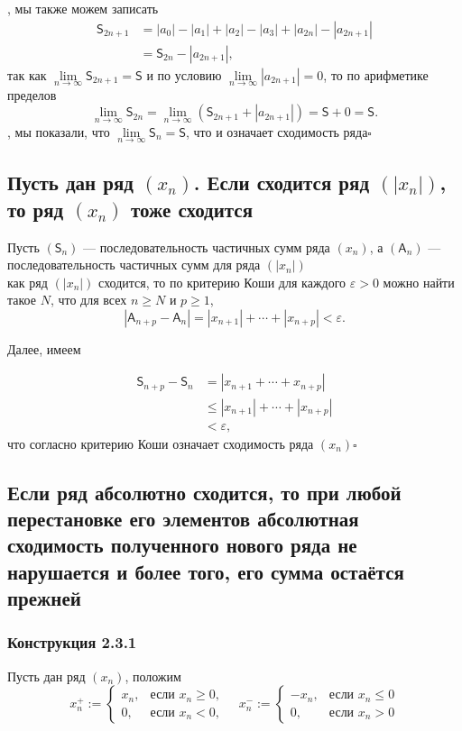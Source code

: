 \documentclass[a4paper]{article}
\newcommand{\qed}{\hfill$\square$}
\begin{document}
, мы также можем записать
$$\begin{aligned}
\mathsf{S}_{2n+1} &= |a_0| - |a_1| + |a_2| - |a_3| +  |a_{2n}| - |a_{2n+1}| \\
&= \mathsf{S}_{2n}  - |a_{2n+1}|,
\end{aligned}$$
так как $\lim\limits_{n \to \infty}\mathsf{S}_{2n+1} = \mathsf{S}$ и по условию $\lim\limits_{n\to \infty} |a_{2n+1}| = 0$, то по арифметике пределов
$$
\lim_{n\to \infty}\mathsf{S}_{2n}  = \lim_{n\to \infty} \left( \mathsf{S}_{2n+1} + |a_{2n+1}| \right) = \mathsf{S} + 0 = \mathsf{S}.
$$
, мы показали, что $\lim\limits_{n \to \infty}\mathsf{S}_n = \mathsf{S}$, что и означает сходимость ряда\qed

\subsection{Пусть дан ряд $(x_n)$. Если сходится ряд $(|x_n|)$, то ряд $(x_n)$ тоже сходится}
\label{2.2}
Пусть $(\mathsf{S}_n)$ — последовательность частичных сумм ряда $(x_n)$, а $(\mathsf{A}_n)$ — последовательность частичных сумм для ряда $(|x_n|)$\\[2mm]
 как ряд $(|x_n|)$ сходится, то по критерию Коши для каждого $\varepsilon >0$ можно найти такое $N$, что для всех $n \geqslant N$ и $p \geqslant 1$,  
$$
| \mathsf{A}_{n+p} - \mathsf{A}_{n} | = |x_{n+1} | + \cdots +|x_{n+p}| < \varepsilon.
$$

Далее, имеем 

$$\begin{aligned}
\mathsf{S}_{n+p} - \mathsf{S}_n &= | x_{n+1} + \cdots + x_{n+p} | \\
&\leqslant  |x_{n+1}| + \cdots + |x_{n+p}| \\
&< \varepsilon,
\end{aligned}$$
что согласно критерию Коши  означает сходимость ряда $(x_n)$\qed 

\subsection{Если ряд абсолютно сходится, то при любой перестановке его элементов абсолютная сходимость полученного нового ряда не нарушается и более того, его сумма
остаётся прежней}
\subsubsection*{Конструкция 2.3.1}
Пусть дан ряд $(x_n)$, положим\label{2.1}
\begin{equation}\label{eq:1}
    x_n^+:=\begin{cases}
        x_n,&\text{если } x_n\geqslant0,\\
        0,&\text{если } x_n<0,
    \end{cases}\quad x_n^-:=\begin{cases}
        -x_n,&\text{если } x_n\leqslant0\\
        0,&\text{если } x_n>0
    \end{cases}
\end{equation}
\end{document}
